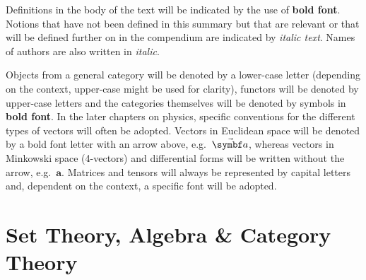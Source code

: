 \documentclass[12pt, a4paper]{report}
\begin{document}
   Definitions in the body of the text will be indicated by the use of \textbf{bold font}. Notions that have not been defined in this summary but that are relevant or that will be defined further on in the compendium are indicated by \textit{italic text}. Names of authors are also written in \textit{italic}.

   Objects from a general category will be denoted by a lower-case letter (depending on the context, upper-case might be used for clarity), functors will be denoted by upper-case letters and the categories themselves will be denoted by symbols in \textbf{bold font}. In the later chapters on physics, specific conventions for the different types of vectors will often be adopted. Vectors in Euclidean space will be denoted by a bold font letter with an arrow above, e.g.~$\vector{a}$, whereas vectors in Minkowski space (4-vectors) and differential forms will be written without the arrow, e.g.~$\symbf{a}$. Matrices and tensors will always be represented by capital letters and, dependent on the context, a specific font will be adopted.

\part{Set Theory, Algebra \& Category Theory}
% 
% 




% 
% 
% 
% 
% 
% 
% 
% 

% 
% 
% 
% 
% 
% 

% 
% 
% 

% 
% 

\end{document}
